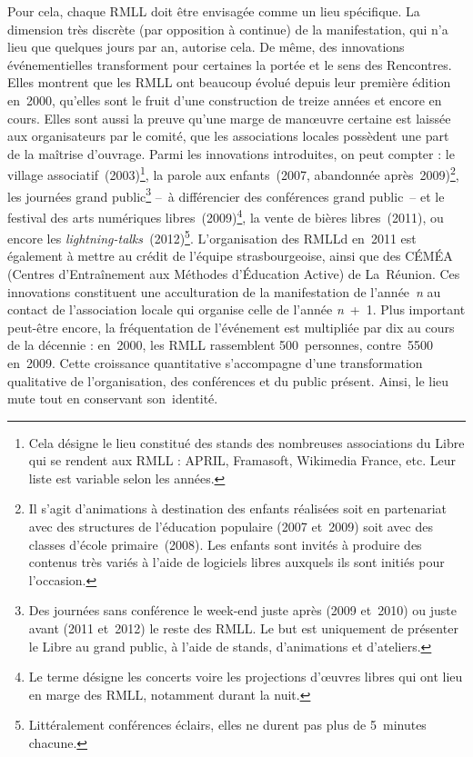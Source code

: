 \documentclass{FramateX}
\begin{document}
\begin{refsection}
Pour cela, chaque RMLL doit être envisagée comme un lieu spécifique. La
dimension très discrète (par opposition à continue) de la
manifestation, qui n'a lieu que quelques jours par an, autorise cela.
De même, des innovations événementielles transforment pour certaines la
portée et le sens des Rencontres. Elles montrent que les RMLL ont
beaucoup évolué depuis leur première édition en~2000, qu'elles sont le
fruit d'une construction de treize années et encore en cours. Elles
sont aussi la preuve qu'une marge de manœuvre certaine est laissée aux
organisateurs par le comité, que les associations locales possèdent une
part de la maîtrise d'ouvrage. Parmi les innovations introduites, on
peut compter : le village associatif~(2003)\footnote{Cela désigne le
lieu constitué des stands des nombreuses associations du Libre qui se
rendent aux RMLL : APRIL, Framasoft, Wikimedia France, etc. Leur liste
est variable selon les années.}, la parole aux enfants~(2007,
abandonnée après~2009)\footnote{Il s'agit d'animations à destination
des enfants réalisées soit en partenariat avec des structures de
l'éducation populaire (2007 et~2009) soit avec des classes d'école
primaire~(2008). Les enfants sont invités à produire des contenus très
variés à l'aide de logiciels libres auxquels ils sont initiés pour
l'occasion.}, les journées grand public\footnote{Des journées sans
conférence le week-end juste après (2009 et~2010) ou juste avant (2011
et~2012) le reste des RMLL. Le but est uniquement de présenter le Libre
au grand public, à l'aide de stands, d'animations et d'ateliers.} –~à différencier des
conférences grand
public~– et le
festival des arts numériques libres~(2009)\footnote{Le terme désigne
les concerts voire les projections d'œuvres libres qui ont lieu en
marge des RMLL, notamment durant la nuit.}, la vente de bières
libres~(2011), ou encore les
\textit{lightning-talks~}(2012)\footnote{Littéralement conférences
éclairs, elles ne durent pas plus de 5~minutes chacune.}.
L'organisation des RMLLd en~2011 est également à mettre au crédit de
l'équipe strasbourgeoise, ainsi que des CÉMÉA (Centres d'Entraînement
aux Méthodes d'Éducation Active) de La~Réunion. Ces innovations
constituent une acculturation de la manifestation de l'année~\textit{n}
au contact de l'association locale qui organise celle de l'année
\textit{n}~+~1. Plus important peut-être encore, la fréquentation de
l'événement est multipliée par dix au cours de la décennie : en~2000,
les RMLL rassemblent 500~personnes, contre~5500 en~2009. Cette
croissance quantitative s'accompagne d'une transformation qualitative
de l'organisation, des conférences et du public présent. Ainsi, le lieu
mute tout en conservant son~identité.


\end{refsection}
\end{document}

